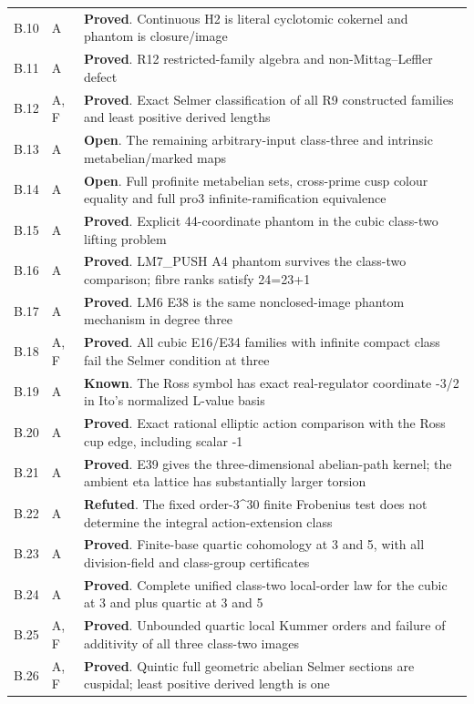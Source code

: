 \begin{longtable}{@{}p{}p{}p{}@{}}
B.10 & A & \textbf{Proved}. Continuous H2 is literal cyclotomic cokernel and phantom is closure/image \\
B.11 & A & \textbf{Proved}. R12 restricted-family algebra and non-Mittag--Leffler defect \\
B.12 & A, F & \textbf{Proved}. Exact Selmer classification of all R9 constructed families and least positive derived lengths \\
B.13 & A & \textbf{Open}. The remaining arbitrary-input class-three and intrinsic metabelian/marked maps \\
B.14 & A & \textbf{Open}. Full profinite metabelian sets, cross-prime cusp colour equality and full pro3 infinite-ramification equivalence \\
B.15 & A & \textbf{Proved}. Explicit 44-coordinate phantom in the cubic class-two lifting problem \\
B.16 & A & \textbf{Proved}. LM7\_PUSH A4 phantom survives the class-two comparison; fibre ranks satisfy 24=23+1 \\
B.17 & A & \textbf{Proved}. LM6 E38 is the same nonclosed-image phantom mechanism in degree three \\
B.18 & A, F & \textbf{Proved}. All cubic E16/E34 families with infinite compact class fail the Selmer condition at three \\
B.19 & A & \textbf{Known}. The Ross symbol has exact real-regulator coordinate -3/2 in Ito's normalized L-value basis \\
B.20 & A & \textbf{Proved}. Exact rational elliptic action comparison with the Ross cup edge, including scalar -1 \\
B.21 & A & \textbf{Proved}. E39 gives the three-dimensional abelian-path kernel; the ambient eta lattice has substantially larger torsion \\
B.22 & A & \textbf{Refuted}. The fixed order-3\textasciicircum{}30 finite Frobenius test does not determine the integral action-extension class \\
B.23 & A & \textbf{Proved}. Finite-base quartic cohomology at 3 and 5, with all division-field and class-group certificates \\
B.24 & A & \textbf{Proved}. Complete unified class-two local-order law for the cubic at 3 and plus quartic at 3 and 5 \\
B.25 & A, F & \textbf{Proved}. Unbounded quartic local Kummer orders and failure of additivity of all three class-two images \\
B.26 & A, F & \textbf{Proved}. Quintic full geometric abelian Selmer sections are cuspidal; least positive derived length is one \\

\end{longtable}
